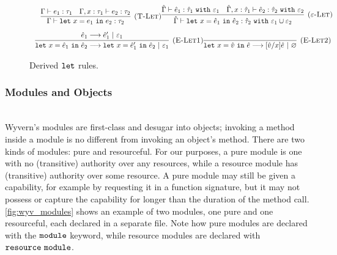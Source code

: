 \begin{figure}[h]


\[
\begin{array}{c}

	~~~
	
	\infer[\textsc{(T-Let)}]
	{\Gamma \vdash \letxpr{x}{e_1}{e_2}: \tau_2}
	{\Gamma \vdash e_1: \tau_1 & \Gamma, x: \tau_1 \vdash e_2: \tau_2}

\infer[\textsc{($\varepsilon$-Let)}]
	{\hat \Gamma \vdash \letxpr{x}{\hat e_1}{\hat e_2} : \hat \tau_2~\kw{with} \varepsilon_1 \cup \varepsilon_2}
	{\hat \Gamma \vdash \hat e_1 : \hat \tau_1~\kw{with} \varepsilon_1 & \hat \Gamma, x: \hat \tau_1 \vdash \hat e_2: \hat \tau_2~\kw{with} \varepsilon_2} \\[2ex]
	
\infer[\textsc{(E-Let1)}]
	{\letxpr{x}{\hat e_1}{\hat e_2} \longrightarrow \letxpr{x}{\hat e_1'}{\hat e_2}~|~\varepsilon_1}
	{\hat e_1 \longrightarrow \hat e_1'~|~\varepsilon_1} 
	
\infer[\textsc{(E-Let2)}]
	{\letxpr{x}{\hat v}{\hat e} \longrightarrow [\hat v/x]\hat e~|~\varnothing}
	{} 

\end{array}
\]

\caption{Derived $\mathtt{let}$ rules.}
\label{fig:let_rules}
\end{figure}


\subsubsection{Modules and Objects}~\\

Wyvern's modules are first-class and desugar into objects; invoking a method inside a module is no different from invoking an object's method. There are two kinds of modules: pure and resourceful. For our purposes, a pure module is one with no (transitive) authority over any resources, while a resource module has (transitive) authority over some resource. A pure module may still be given a capability, for example by requesting it in a function signature, but it may not possess or capture the capability for longer than the duration of the method call. \ref{fig:wyv_modules} shows an example of two modules, one pure and one resourceful, each declared in a separate file. Note how pure modules are declared with the $\mathtt{module}$ keyword, while resource modules are declared with $\mathtt{resource~module}$.

